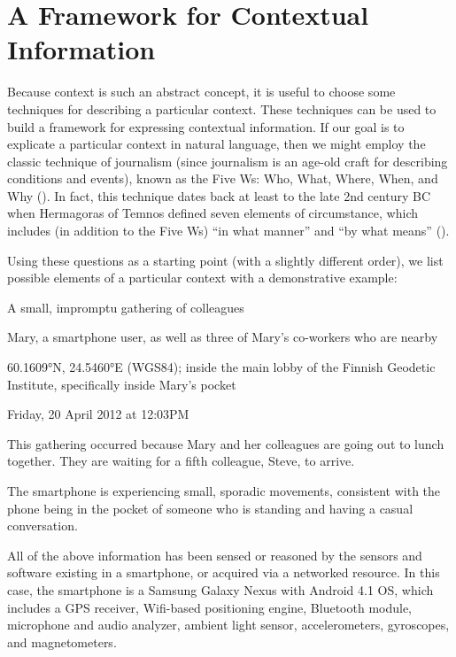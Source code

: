 \section{A Framework for Contextual Information}

Because context is such an abstract concept, it is useful to choose some techniques for describing a particular context. These techniques can be used to build a framework for expressing contextual information. If our goal is to explicate a particular context in natural language, then we might employ the classic technique of journalism (since journalism is an age-old craft for describing conditions and events), known as the Five Ws: Who, What, Where, When, and Why (). In fact, this technique dates back at least to the late 2nd  century BC when Hermagoras of Temnos defined seven elements of circumstance, which includes (in addition to the Five Ws) ``in what manner'' and ``by what means'' ().

Using these questions as a starting point (with a slightly different order), we list possible elements of a particular context with a demonstrative example:

\begin{bold_description}
\item[What:]A small, impromptu gathering of colleagues
\item[Who:]Mary, a smartphone user, as well as three of Mary's co-workers who are nearby
\item[Where:]60.1609°N, 24.5460°E (WGS84); inside the main lobby of the Finnish Geodetic Institute, specifically inside Mary's pocket
\item[When:]Friday, 20 April 2012 at 12:03PM
\item[Why:]This gathering occurred because Mary and her colleagues are going out to lunch together. They are waiting for a fifth colleague, Steve, to arrive.
\item[In What Manner:]The smartphone is experiencing small, sporadic movements, consistent with the phone being in the pocket of someone who is standing and having a casual conversation.
\item[By What Means:]All of the above information has been sensed or reasoned by the sensors and software existing in a smartphone, or acquired via a networked resource. In this case, the smartphone is a Samsung Galaxy Nexus with Android 4.1 OS, which includes a GPS receiver, Wifi-based positioning engine, Bluetooth module, microphone and audio analyzer, ambient light sensor, accelerometers, gyroscopes, and magnetometers.
\end{bold_description}


